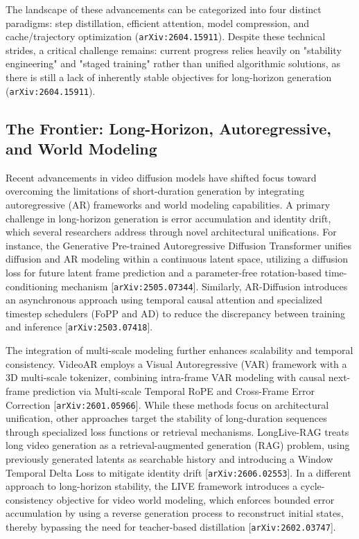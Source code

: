 \documentclass[11pt]{article}
\begin{document}
The landscape of these advancements can be categorized into four distinct paradigms: step distillation, efficient attention, model compression, and cache/trajectory optimization (\texttt{arXiv:2604.15911}). Despite these technical strides, a critical challenge remains: current progress relies heavily on "stability engineering" and "staged training" rather than unified algorithmic solutions, as there is still a lack of inherently stable objectives for long-horizon generation (\texttt{arXiv:2604.15911}).

\subsection{The Frontier: Long-Horizon, Autoregressive, and World Modeling}

Recent advancements in video diffusion models have shifted focus toward overcoming the limitations of short-duration generation by integrating autoregressive (AR) frameworks and world modeling capabilities. A primary challenge in long-horizon generation is error accumulation and identity drift, which several researchers address through novel architectural unifications. For instance, the Generative Pre-trained Autoregressive Diffusion Transformer unifies diffusion and AR modeling within a continuous latent space, utilizing a diffusion loss for future latent frame prediction and a parameter-free rotation-based time-conditioning mechanism [\texttt{arXiv:2505.07344}]. Similarly, AR-Diffusion introduces an asynchronous approach using temporal causal attention and specialized timestep schedulers (FoPP and AD) to reduce the discrepancy between training and inference [\texttt{arXiv:2503.07418}].

The integration of multi-scale modeling further enhances scalability and temporal consistency. VideoAR employs a Visual Autoregressive (VAR) framework with a 3D multi-scale tokenizer, combining intra-frame VAR modeling with causal next-frame prediction via Multi-scale Temporal RoPE and Cross-Frame Error Correction [\texttt{arXiv:2601.05966}]. While these methods focus on architectural unification, other approaches target the stability of long-duration sequences through specialized loss functions or retrieval mechanisms. LongLive-RAG treats long video generation as a retrieval-augmented generation (RAG) problem, using previously generated latents as searchable history and introducing a Window Temporal Delta Loss to mitigate identity drift [\texttt{arXiv:2606.02553}]. In a different approach to long-horizon stability, the LIVE framework introduces a cycle-consistency objective for video world modeling, which enforces bounded error accumulation by using a reverse generation process to reconstruct initial states, thereby bypassing the need for teacher-based distillation [\texttt{arXiv:2602.03747}].
\end{document}
